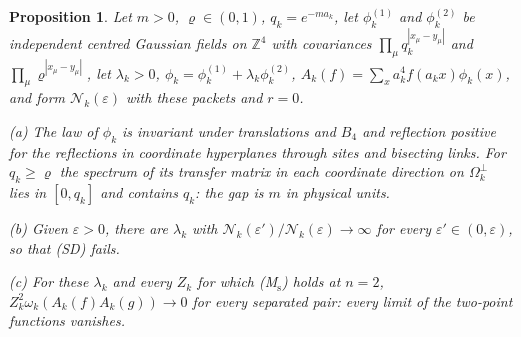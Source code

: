 \documentclass[aps,prd,twocolumn,superscriptaddress,nofootinbib,longbibliography,floatfix,amsmath,amssymb,10pt]{revtex4-2}
\newtheorem{proposition}[theorem]{Proposition}
\theoremstyle{definition}
\theoremstyle{remark}
\newcommand{\Z}{\mathbb{Z}}
\begin{document}
\begin{proposition}\label{prop:limitEheavy}
Let $m>0$, $\varrho\in(0,1)$, $q_k=e^{-ma_k}$, let $\phi^{(1)}_k$ and
$\phi^{(2)}_k$ be independent centred Gaussian fields on $\Z^4$ with
covariances $\prod_\mu q_k^{|x_\mu-y_\mu|}$ and $\prod_\mu
\varrho^{|x_\mu-y_\mu|}$, let $\lambda_k>0$, $\phi_k=\phi^{(1)}_k+\lambda_k
\phi^{(2)}_k$, $A_k(f)=\sum_xa_k^4f(a_kx)\phi_k(x)$, and form $\mathcal
N_k(\varepsilon)$ with these packets and $r=0$.

\textup{(a)} The law of $\phi_k$ is invariant under translations and $B_4$
and reflection positive for the reflections in coordinate hyperplanes
through sites and bisecting links. For $q_k\ge \varrho$ the spectrum of its
transfer matrix in each coordinate direction on $\Omega_k^\perp$ lies in
$[0,q_k]$ and contains $q_k$: the gap is $m$ in physical units.

\textup{(b)} Given $\varepsilon>0$, there are $\lambda_k$ with $\mathcal
N_k(\varepsilon')/\mathcal N_k(\varepsilon)\to\infty$ for every
$\varepsilon'\in(0,\varepsilon)$, so that \textup{(SD)} fails.

\textup{(c)} For these $\lambda_k$ and every $Z_k$ for which
\textup{(M$_{\mathrm s}$)} holds at $n=2$, $Z_k^2\omega_k(A_k(f)A_k(g))\to0$
for every separated pair: every limit of the two-point functions vanishes.
\end{proposition}
\end{document}

